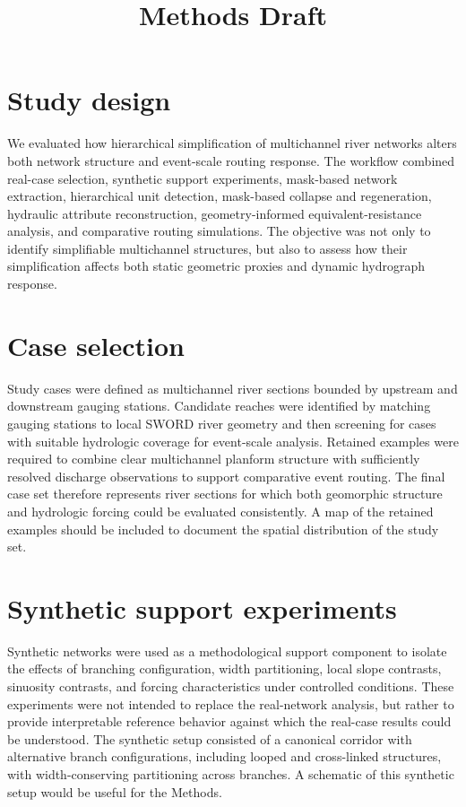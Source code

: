 \documentclass[11pt]{article}
\title{Methods Draft}
\author{}
\date{}
\begin{document}
\maketitle

\section{Study design}
We evaluated how hierarchical simplification of multichannel river networks alters both network structure and event-scale routing response. The workflow combined real-case selection, synthetic support experiments, mask-based network extraction, hierarchical unit detection, mask-based collapse and regeneration, hydraulic attribute reconstruction, geometry-informed equivalent-resistance analysis, and comparative routing simulations. The objective was not only to identify simplifiable multichannel structures, but also to assess how their simplification affects both static geometric proxies and dynamic hydrograph response.

\section{Case selection}
Study cases were defined as multichannel river sections bounded by upstream and downstream gauging stations. Candidate reaches were identified by matching gauging stations to local SWORD river geometry and then screening for cases with suitable hydrologic coverage for event-scale analysis. Retained examples were required to combine clear multichannel planform structure with sufficiently resolved discharge observations to support comparative event routing. The final case set therefore represents river sections for which both geomorphic structure and hydrologic forcing could be evaluated consistently. A map of the retained examples should be included to document the spatial distribution of the study set.

\section{Synthetic support experiments}
Synthetic networks were used as a methodological support component to isolate the effects of branching configuration, width partitioning, local slope contrasts, sinuosity contrasts, and forcing characteristics under controlled conditions. These experiments were not intended to replace the real-network analysis, but rather to provide interpretable reference behavior against which the real-case results could be understood. The synthetic setup consisted of a canonical corridor with alternative branch configurations, including looped and cross-linked structures, with width-conserving partitioning across branches. A schematic of this synthetic setup would be useful for the Methods.
\end{document}

